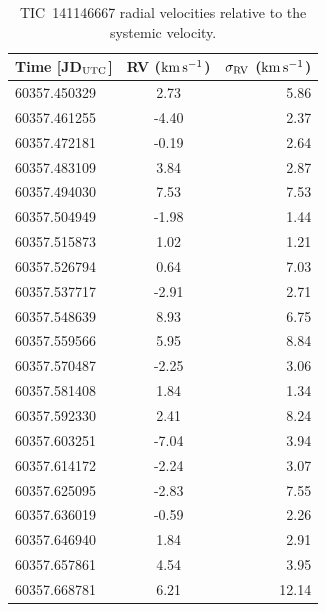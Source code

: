 \documentclass{nature3}
\newcommand{\kms}{\ensuremath{\rm km\,s^{-1}}}
\begin{document}
\begin{methods}
\begin{table}
  \centering
  \begin{tabular}{lcr}
  \hline 
  \hline 
  Time [JD$_{\rm UTC}$] & RV (\kms) & $\sigma_{\rm RV}$ (\kms) \\
  \hline 
  60357.450329 & 2.73 & 5.86 \\
  60357.461255 & -4.40 & 2.37 \\
  60357.472181 & -0.19 & 2.64 \\
  60357.483109 & 3.84 & 2.87 \\
  60357.494030 & 7.53 & 7.53 \\
  60357.504949 & -1.98 & 1.44 \\
  60357.515873 & 1.02 & 1.21 \\
  60357.526794 & 0.64 & 7.03 \\
  60357.537717 & -2.91 & 2.71 \\
  60357.548639 & 8.93 & 6.75 \\
  60357.559566 & 5.95 & 8.84 \\
  60357.570487 & -2.25 & 3.06 \\
  60357.581408 & 1.84 & 1.34 \\
  60357.592330 & 2.41 & 8.24 \\
  60357.603251 & -7.04 & 3.94 \\
  60357.614172 & -2.24 & 3.07 \\
  60357.625095 & -2.83 & 7.55 \\
  60357.636019 & -0.59 & 2.26 \\
  60357.646940 & 1.84 & 2.91 \\
  60357.657861 & 4.54 & 3.95 \\
  60357.668781 & 6.21 & 12.14 \\
  \hline
  \end{tabular}
  \caption{TIC~141146667 radial velocities relative to the systemic velocity.}
  \label{tab:rv}
\end{table}



\end{methods}

   
\end{document}
